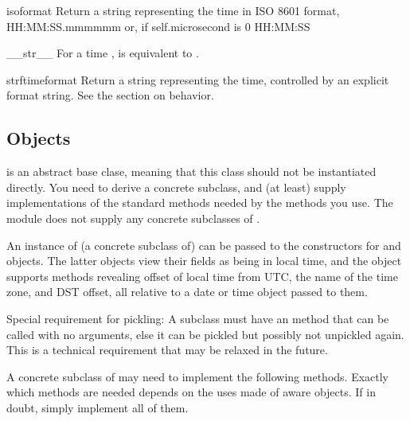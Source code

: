 \begin{methoddesc}{isoformat}{}
  Return a string representing the time in ISO 8601 format,
      HH:MM:SS.mmmmmm
  or, if self.microsecond is 0
      HH:MM:SS
\end{methoddesc}

\begin{methoddesc}{__str__}{}
  For a time ,  is equivalent to
  .
\end{methoddesc}

\begin{methoddesc}{strftime}{format}
  Return a string representing the time, controlled by an explicit
  format string.  See the section on  behavior.
\end{methoddesc}


\subsection{ Objects \label{datetime-tzinfo}}

 is an abstract base clase, meaning that this class
should not be instantiated directly.  You need to derive a concrete
subclass, and (at least) supply implementations of the standard
 methods needed by the  methods you
use.  The  module does not supply any concrete
subclasses of .

An instance of (a concrete subclass of)  can be passed
to the constructors for  and  objects.
The latter objects view their fields as being in local time, and the
 object supports methods revealing offset of local time
from UTC, the name of the time zone, and DST offset, all relative to a
date or time object passed to them.

Special requirement for pickling:  A  subclass must have an
 method that can be called with no arguments, else it
can be pickled but possibly not unpickled again.  This is a technical
requirement that may be relaxed in the future.

A concrete subclass of  may need to implement the
following methods.  Exactly which methods are needed depends on the
uses made of aware  objects.  If in doubt, simply
implement all of them.

